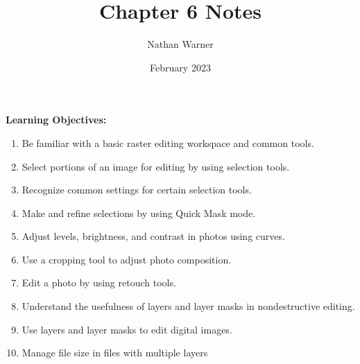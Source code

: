 \documentclass{report}
\title{Chapter 6 Notes}
\author{Nathan Warner}
\date{February 2023}
\begin{document}
\maketitle

    \begin{Large}
        \noindent \textbf{Learning Objectives:}
    \end{Large}
    \bigbreak \noindent
    \begin{enumerate}
        \item Be familiar with a basic raster editing workspace and common tools. 
        \item Select portions of an image for editing by using selection tools.
        \item Recognize common settings for certain selection tools.
        \item Make and refine selections by using Quick Mask mode.
        \item Adjust levels, brightness, and contrast in photos using curves.
        \item Use a cropping tool to adjust photo composition.
        \item Edit a photo by using retouch tools.
        \item Understand the usefulness of layers and layer masks in nondestructive editing.
        \item Use layers and layer masks to edit digital images.
        \item Manage file size in files with multiple layers  
    \end{enumerate}
\end{document}

